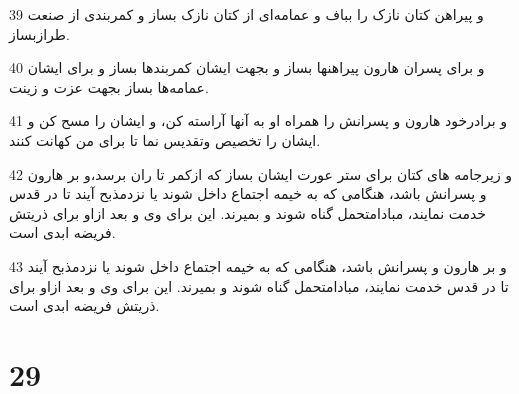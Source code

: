 \par 39 و پیراهن کتان نازک را بباف و عمامه‌ای از کتان نازک بساز و کمربندی از صنعت طرازبساز.
\par 40 و برای پسران هارون پیراهنها بساز و بجهت ایشان کمربندها بساز و برای ایشان عمامه‌ها بساز بجهت عزت و زینت.
\par 41 و برادرخود هارون و پسرانش را همراه او به آنها آراسته کن، و ایشان را مسح کن و ایشان را تخصیص وتقدیس نما تا برای من کهانت کنند.
\par 42 و زیرجامه های کتان برای ستر عورت ایشان بساز که ازکمر تا ران برسد،و بر هارون و پسرانش باشد، هنگامی که به خیمه اجتماع داخل شوند یا نزدمذبح آیند تا در قدس خدمت نمایند، مبادامتحمل گناه شوند و بمیرند. این برای وی و بعد ازاو برای ذریتش فریضه ابدی است.
\par 43 و بر هارون و پسرانش باشد، هنگامی که به خیمه اجتماع داخل شوند یا نزدمذبح آیند تا در قدس خدمت نمایند، مبادامتحمل گناه شوند و بمیرند. این برای وی و بعد ازاو برای ذریتش فریضه ابدی است.
 
\chapter{29}

